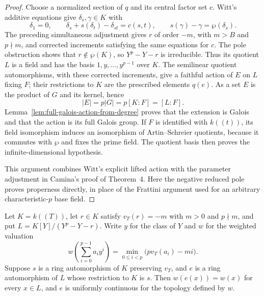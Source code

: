 \begin{proof}
Choose a normalized section of $q$ and its central factor set $c$.
Witt's additive equations give $\delta_s,\gamma\in K$ with
\[
 \delta_1=0,\qquad
 \delta_s+s(\delta_t)-\delta_{st}=c(s,t),\qquad
 s(\gamma)-\gamma=\wp(\delta_s).
\]
The preceding simultaneous adjustment gives $r$ of order $-m$,
with $m>B$ and $p\nmid m$, and corrected increments satisfying
the same equations for $c$. The pole obstruction shows that
$r\notin\wp(K)$, so $Y^p-Y-r$ is irreducible. Thus its quotient
$L$ is a field and has the basis $1,y,\ldots,y^{p-1}$ over $K$.
The semilinear quotient automorphisms, with these corrected
increments, give a faithful action of $E$ on $L$ fixing $F$;
their restrictions to $K$ are the prescribed elements $q(e)$.
As a set $E$ is the product of $G$ and its kernel, hence
\[
 |E|=p|G|=p[K:F]=[L:F].
\]
Lemma~\ref{lem:full-galois-action-from-degree} proves that the
extension is Galois and that the action is its full Galois group.
If $F$ is identified with $k((t))$, its field isomorphism induces
an isomorphism of Artin--Schreier quotients, because it commutes
with $\wp$ and fixes the prime field. The quotient basis then
proves the infinite-dimensional hypothesis.

This argument combines Witt's explicit lifted action with the
parameter adjustment in Camina's proof of Theorem~4. Here the
negative reduced pole proves properness directly, in place of
the Frattini argument used for an arbitrary characteristic-$p$
base field.
\end{proof}

\begin{lemma}
\label{lem:artin-schreier-semilinear-valuation}
\leanok
Let $K=k((T))$, let $r\in K$ satisfy $v_T(r)=-m$ with
$m>0$ and $p\nmid m$, and put $L=K[Y]/(Y^p-Y-r)$.
Write $y$ for the class of $Y$ and $w$ for the weighted valuation
\[
 w\left(\sum_{i=0}^{p-1}a_i y^i\right)
   =\min_{0\le i<p}\bigl(pv_T(a_i)-mi\bigr).
\]
Suppose $s$ is a ring automorphism of $K$ preserving $v_T$,
and $e$ is a ring automorphism of $L$ whose restriction to $K$
is $s$. Then $w(e(x))=w(x)$ for every $x\in L$, and $e$
is uniformly continuous for the topology defined by $w$.
\end{lemma}

